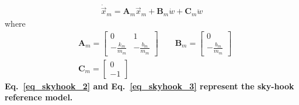 \documentclass[11pt,a4paper,oneside]{book}
\numberwithin{equation}{section}
\theoremstyle{it}
\theoremstyle{definition}
\begin{document}
\begin{mybox}
	\begin{equation}\label{eq_skyhook_2}
		\begin{aligned}
			\dot{\vec{x}}_m = \mathbf{A}_m{\vec{x}}_m + \mathbf{B}_m\dot{w} + \mathbf{C}_m\ddot{w} 
		\end{aligned}
	\end{equation} 
	where
	\begin{equation}\label{eq_skyhook_3}
		\begin{aligned}
			&\mathbf{A}_m = \begin{bmatrix} 0 & 1 \\[6pt] -\frac{k_m}{m_m} & -\frac{b_m}{m_m} \end{bmatrix}\qquad \mathbf{B}_m = \begin{bmatrix} 0 \\[6pt] -\frac{b_m}{m_m} \end{bmatrix} \\[6pt] &\mathbf{C}_m =\begin{bmatrix} 0 \\[6pt] -1 \end{bmatrix}
		\end{aligned}
	\end{equation} 
	\textbf{Eq.~\ref{eq_skyhook_2} and Eq.~\ref{eq_skyhook_3} represent the sky-hook reference model.}
\end{mybox}
\end{document}
